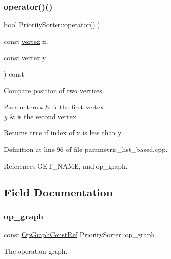 \subsubsection{\texorpdfstring{operator()()}{operator()()}}
{\footnotesize\ttfamily bool Priority\+Sorter\+::operator() (\begin{DoxyParamCaption}\item[{const \hyperlink{graph_8hpp_abefdcf0544e601805af44eca032cca14}{vertex}}]{x,  }\item[{const \hyperlink{graph_8hpp_abefdcf0544e601805af44eca032cca14}{vertex}}]{y }\end{DoxyParamCaption}) const}



Compare position of two vertices. 


\begin{DoxyParams}{Parameters}
{\em x} & is the first vertex \\
\hline
{\em y} & is the second vertex \\
\hline
\end{DoxyParams}
\begin{DoxyReturn}{Returns}
true if index of x is less than y 
\end{DoxyReturn}


Definition at line 96 of file parametric\+\_\+list\+\_\+based.\+cpp.



References G\+E\+T\+\_\+\+N\+A\+ME, and op\+\_\+graph.



\subsection{Field Documentation}
\mbox{\label{structPrioritySorter_a36ee4d644e6934e3d0a41e7c568c30a0}} 
\subsubsection{\texorpdfstring{op\+\_\+graph}{op\_graph}}
{\footnotesize\ttfamily const \hyperlink{op__graph_8hpp_a9a0b240622c47584bee6951a6f5de746}{Op\+Graph\+Const\+Ref} Priority\+Sorter\+::op\+\_\+graph}



The operation graph. 



